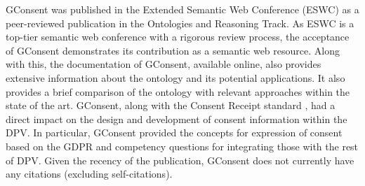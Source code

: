 GConsent was published in the Extended Semantic Web Conference (ESWC) as a peer-reviewed publication \cite{pandit_gconsent_2019} in the Ontologies and Reasoning Track. As ESWC is a top-tier semantic web conference with a rigorous review process, the acceptance of GConsent demonstrates its contribution as a semantic web resource.
Along with this, the documentation of GConsent, available online, also provides extensive information about the ontology and its potential applications. It also provides a brief comparison of the ontology with relevant approaches within the state of the art.
GConsent, along with the Consent Receipt standard \cite{lizar_consent_2017}, had a direct impact on the design and development of consent information within the DPV. In particular, GConsent provided the concepts for expression of consent based on the GDPR and competency questions for integrating those with the rest of DPV.
Given the recency of the publication, GConsent does not currently have any citations (excluding self-citations).

